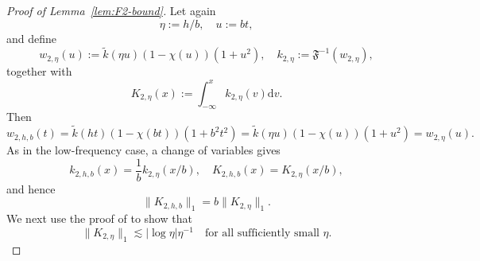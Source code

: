 \documentclass[english, 11pt]{article}
\newcommand{\mrd}{\mathrm{d}}
\newcommand{\FT}[1]{\widetilde{#1}}
\theoremstyle{plain}
\theoremstyle{definition}
\theoremstyle{remark}
\begin{document}
\begin{appendix}
\begin{proof}[Proof of Lemma~\ref{lem:F2-bound}]
Let again
\begin{equation*}
\eta:=h/b,\quad u:=bt,
\end{equation*}
and define
\begin{equation*}
w_{2,\eta}(u):=\FT{k}(\eta u)\left(1-\chi(u)\right)(1+u^2),\quad k_{2,\eta}:=\mathfrak F^{-1}(w_{2,\eta}),
\end{equation*}
together with
\begin{equation*}
K_{2,\eta}(x):=\int_{-\infty}^x k_{2,\eta}(v) \mrd v.
\end{equation*}
Then
\begin{equation*}
w_{2,h,b}(t) = \FT{k}(ht)\left(1-\chi(bt)\right)(1+b^2t^2) = \FT{k}(\eta u)\left(1-\chi(u)\right)(1+u^2) = w_{2,\eta}(u).
\end{equation*}
As in the low-frequency case, a change of variables gives
\begin{equation*}
k_{2,h,b}(x)=\frac{1}{b}k_{2,\eta}(x/b),\quad K_{2,h,b}(x)=K_{2,\eta}(x/b),
\end{equation*}
and hence
\begin{equation*}
\|K_{2,h,b}\|_1=b \|K_{2,\eta}\|_1.
\end{equation*}
We next use the proof of \cite[Lemma S1.2]{rousseau2024wasserstein} to show that
\begin{equation*}
\|K_{2,\eta}\|_1 \lesssim |\log\eta| \eta^{-1}\quad\text{for all sufficiently small }\eta.
\end{equation*}


\end{proof}
\end{appendix}
\end{document}
